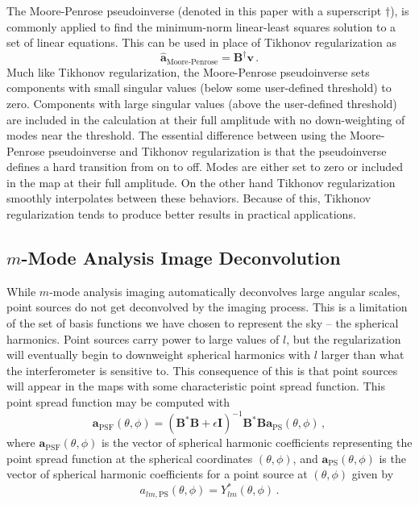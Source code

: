 \documentclass[twocolumn]{aastex6}
\renewcommand{\b}{\pmb}
\begin{document}
The Moore-Penrose pseudoinverse (denoted in this paper with a superscript $\dagger$), is commonly
applied to find the minimum-norm linear-least squares solution to a set of linear equations. This
can be used in place of Tikhonov regularization as
\begin{equation}
    \b{\hat a}_\text{Moore-Penrose} = \b B^\dagger\b v\,.
\end{equation}
Much like Tikhonov regularization, the Moore-Penrose pseudoinverse sets components with small
singular values (below some user-defined threshold) to zero. Components with large singular values
(above the user-defined threshold) are included in the calculation at their full amplitude with no
down-weighting of modes near the threshold. The essential difference between using the Moore-Penrose
pseudoinverse and Tikhonov regularization is that the pseudoinverse defines a hard transition from
on to off. Modes are either set to zero or included in the map at their full amplitude. On the other
hand Tikhonov regularization smoothly interpolates between these behaviors. Because of this,
Tikhonov regularization tends to produce better results in practical applications.

\subsection{$m$-Mode Analysis Image Deconvolution}

While $m$-mode analysis imaging automatically deconvolves large angular scales, point sources do not
get deconvolved by the imaging process. This is a limitation of the set of basis functions we have
chosen to represent the sky -- the spherical harmonics. Point sources carry power to large values of
$l$, but the regularization will eventually begin to downweight spherical harmonics with $l$ larger
than what the interferometer is sensitive to. This consequence of this is that point sources will
appear in the maps with some characteristic point spread function. This point spread function may be
computed with
\begin{equation}
    \b a_\text{PSF}(\theta, \phi)
        = (\b B^*\b B + \epsilon\b I)^{-1}\b B^*\b B\b a_\text{PS}(\theta, \phi)\,,
\end{equation}
where $\b a_\text{PSF}(\theta, \phi)$ is the vector of spherical harmonic coefficients representing
the point spread function at the spherical coordinates $(\theta, \phi)$, and $\b a_\text{PS}(\theta,
\phi)$ is the vector of spherical harmonic coefficients for a point source at $(\theta, \phi)$ given
by
\begin{equation}
    a_{lm, \text{PS}}(\theta, \phi) = Y_{lm}^*(\theta, \phi)\,.
\end{equation}
\end{document}
